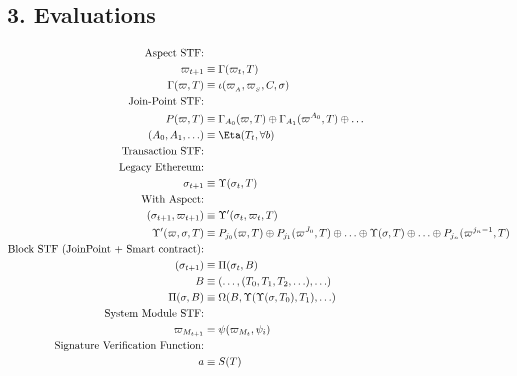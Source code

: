 \subsection*{3. Evaluations}
\begin{align*}
\text{Aspect STF:} & \\
\varpi_{t+1} & \equiv \Gamma(\varpi_t, T) \\
\Gamma(\varpi, T) & \equiv \iota(\varpi_{_A}, \varpi_{_S}, C, \sigma) \\
\text{Join-Point STF:} & \\
P(\varpi, T) & \equiv \Gamma_{A_0}(\varpi, T) \oplus \Gamma_{A_1}(\varpi^{A_0}, T) \oplus \ldots \\
(A_0, A_1, \ldots) & \equiv \Eta(T_t, \forall b) \\
\text{Transaction STF:} & \\
\text{Legacy Ethereum:} & \\
\sigma_{t+1} & \equiv \Upsilon(\sigma_t, T) \\
\text{With Aspect:} & \\
(\sigma_{t+1}, \varpi_{t+1}) & \equiv \Upsilon'(\sigma_t, \varpi_t, T) \\
\Upsilon'(\varpi, \sigma, T) & \equiv P_{j_0}(\varpi, T) \oplus P_{j_1}(\varpi^{J_0}, T) \oplus \ldots \oplus \Upsilon(\sigma, T) \oplus \ldots \oplus P_{j_n}(\varpi^{j_n-1}, T) \\
\text{Block STF (JoinPoint + Smart contract):} & \\
(\sigma_{t+1}) & \equiv \Pi(\sigma_t, B) \\
B & \equiv (\ldots, (T_0, T_1, T_2, \ldots), \ldots) \\
\Pi(\sigma, B) & \equiv \Omega(B, \Upsilon(\Upsilon(\sigma, T_0), T_1), \ldots) \\
\text{System Module STF:} & \\
\varpi_{M_{t+1}} & = \psi(\varpi_{M_t}, \psi_i) \\
\text{Signature Verification Function:} & \\
a & \equiv S(T) \\
\end{align*}

